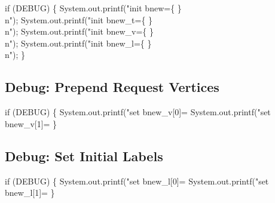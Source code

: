 \nwenddocs{}\endmoddef\nwstartdeflinemarkup{}\nwenddeflinemarkup
if (DEBUG) \{
  System.out.printf("init bnew=\{ \}\\n");
  System.out.printf("init bnew_t=\{ \}\\n");
  System.out.printf("init bnew_v=\{ \}\\n");
  System.out.printf("init bnew_l=\{ \}\\n");
\}
\nwendcode{}\nwdocspar

\subsection{Debug: Prepend Request Vertices}

\nwenddocs{}\endmoddef\nwstartdeflinemarkup{}\nwenddeflinemarkup
if (DEBUG) \{
  System.out.printf("set bnew_v[0]=%
  System.out.printf("set bnew_v[1]=%
\}
\nwendcode{}\nwdocspar

\subsection{Debug: Set Initial Labels}

\nwenddocs{}\endmoddef\nwstartdeflinemarkup{}\nwenddeflinemarkup
if (DEBUG) \{
  System.out.printf("set bnew_l[0]=%
  System.out.printf("set bnew_l[1]=%
\}
\nwendcode{}\nwdocspar


